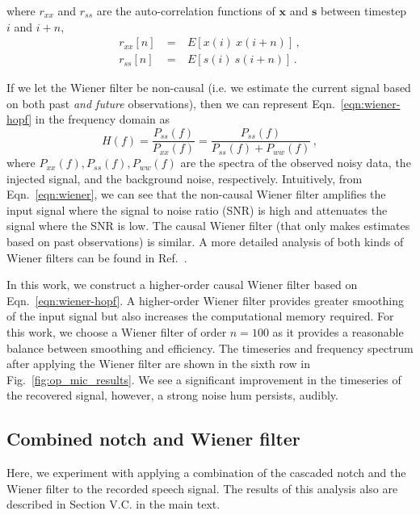 \documentclass[aps,pra,superscriptaddress,reprint,nofootinbib]{revtex4-1}
\begin{document}
where $r_{xx}$ and $r_{ss}$ are the auto-correlation functions of $\mathbf{x}$ and $\mathbf{s}$ between timestep $i$ and $i+n$, 
\begin{eqnarray} 
r_{xx}[n] &~=~& E[x(i)~x(i+n)] \,,\\
r_{ss}[n] &~=~& E[s(i)~s(i+n)] \,.
\end{eqnarray} 



If we let the Wiener filter be non-causal (i.e. we estimate the current signal based on both past \emph{and future} observations), then we can represent Eqn.~\ref{eqn:wiener-hopf} in the frequency domain as
\begin{equation}
\label{eqn:wiener}
    H(f)=\frac{P_{ss}(f)}{P_{xx}(f)}=\frac{P_{ss}(f)}{P_{ss}(f)+P_{ww}(f)}\,,
\end{equation}
where $P_{xx}(f), P_{ss}(f), P_{ww}(f)$ are the spectra of the observed noisy data, the injected signal, and the background noise, respectively. Intuitively, from Eqn.~\ref{eqn:wiener}, we can see that the non-causal Wiener filter amplifies the input signal where the signal to noise ratio (SNR) is high and attenuates the signal where the SNR is low. The causal Wiener filter (that only makes estimates based on past observations) is similar. A more detailed analysis of both kinds of Wiener filters can be found in Ref.~\citep{10.5555/151045}.


In this work, we construct a higher-order causal Wiener filter based on Eqn.~\ref{eqn:wiener-hopf}. A higher-order Wiener filter provides greater smoothing of the input signal but also increases the computational memory required. For this work, we choose a Wiener filter of order $n=100$ as it provides a reasonable balance between smoothing and efficiency. The timeseries and frequency spectrum after applying the Wiener filter are shown in the sixth row in Fig.~\ref{fig:op_mic_results}.
We see a significant improvement in the timeseries of the recovered signal, however, a strong noise hum persists, audibly. 


\subsection{Combined notch and Wiener filter}

Here, we experiment with applying a combination of the cascaded notch and the Wiener filter to the recorded speech signal. 
The results of this analysis also are described in Section V.C. in the main text. 
\end{document}

